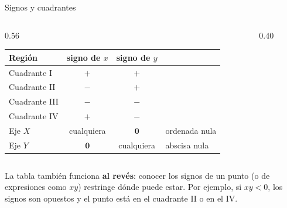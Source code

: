 \documentclass[aspectratio=169,10pt]{beamer}
\newcommand{\destaca}[1]{%
  \par\vspace{3pt}\noindent
  \colorbox{turquesaClaro}{%
    \parbox{\dimexpr\linewidth-2\fboxsep\relax}{\vspace{3pt}#1\vspace{3pt}}}%
  \par\vspace{3pt}}
\begin{document}
\begin{frame}{Signos y cuadrantes}
  \begin{columns}[T]
    \begin{column}{0.56\textwidth}
      \centering
      {\small
      \begin{tabular}{@{}lccl@{}}
        \toprule
        \textbf{Región} & \textbf{signo de $x$} & \textbf{signo de $y$} & \\
        \midrule
        Cuadrante I & $+$ & $+$ & \\
        Cuadrante II & $-$ & $+$ & \\
        Cuadrante III & $-$ & $-$ & \\
        Cuadrante IV & $+$ & $-$ & \\
        \midrule
        Eje $X$ & cualquiera & $\mathbf{0}$ & ordenada nula \\
        Eje $Y$ & $\mathbf{0}$ & cualquiera & abscisa nula \\
        \bottomrule
      \end{tabular}}
    \end{column}
    \begin{column}{0.40\textwidth}
      \begin{center}
      \end{center}
    \end{column}
  \end{columns}

  \vspace{0.4cm}
  \raggedright
  \destaca{La tabla también funciona \textbf{al revés}: conocer los signos
  de un punto (o de expresiones como $xy$) restringe dónde puede estar.
  Por ejemplo, si $xy<0$, los signos son opuestos y el punto está en el
  cuadrante II o en el IV. %
  }
\end{frame}
\end{document}
